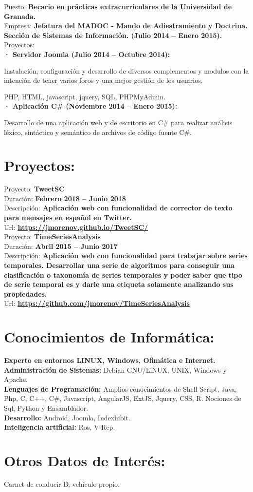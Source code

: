 \documentclass	[10pt,a4paper,oneside]{article}
\newcommand{\seccion}[1]{\vspace*{3mm}\section*{#1}\vspace*{-3mm}}
\begin{document}
Puesto: \textbf{Becario en prácticas extracurriculares de la Universidad de Granada.}\\
Empresa: \textbf{Jefatura del MADOC - Mando de Adiestramiento y Doctrina. Sección de Sistemas de Información. (Julio 2014 – Enero 2015).}\\
Proyectos:\\
\hspace*{1cm}\textbf{· Servidor Joomla (Julio 2014 – Octubre 2014):}\par
{\addtolength{\leftskip}{2cm}Instalación, configuraci\'on y desarrollo de diversos complementos y modulos con la intención de tener varios foros y una mejor gestión de los usuarios.\par}
\hspace*{2cm}PHP, HTML, javascript, jquery, SQL, PHPMyAdmin.\\
\hspace*{1cm}\textbf{· Aplicación C\# (Noviembre 2014 – Enero 2015):}\par
{\addtolength{\leftskip}{2cm}
Desarrollo de una aplicación web y de escritorio en C\# para realizar análisis léxico, sintáctico y semántico de archivos de código fuente C\#.\par}

\seccion{Proyectos:}

Proyecto: \textbf{TweetSC}\\
Duración: \textbf{Febrero 2018 – Junio 2018}\\
Descripción: \textbf{Aplicación web con funcionalidad de corrector de texto para mensajes en español en Twitter.}\\
Url: \textbf{\url{https://jmorenov.github.io/TweetSC/}}\\

Proyecto: \textbf{TimeSeriesAnalysis}\\
Duración: \textbf{Abril 2015 – Junio 2017}\\
Descripción: \textbf{Aplicación web con funcionalidad para trabajar sobre series temporales. Desarrollar una serie de algoritmos para conseguir una clasificación o taxonomía de series temporales y poder saber que tipo de serie temporal es y darle una etiqueta solamente analizando sus propiedades.}\\
Url: \textbf{\url{https://github.com/jmorenov/TimeSeriesAnalysis}}

\seccion{Conocimientos de Informática:}
\textbf{Experto en entornos LINUX, Windows, Ofimática e Internet.}\\
\textbf{Administración de Sistemas:} Debian GNU/LiNUX, UNIX, Windows y Apache.\\
\textbf{Lenguajes de Programación:} Amplios conocimientos de Shell Script, Java, Php, C,
C++, C\#, Javascript, AngularJS, ExtJS, Jquery, CSS, R. Nociones de Sql, Python y Ensamblador.\\
\textbf{Desarrollo:} Android, Joomla, Indexhibit.\\
\textbf{Inteligencia artificial:} Ros, V-Rep.

\seccion{Otros Datos de Interés:}
Carnet de conducir B; vehículo propio.\\
\end{document}
